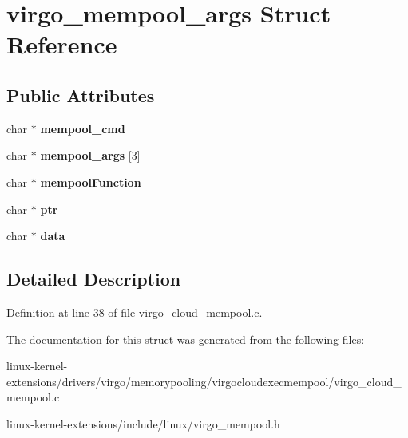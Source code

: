 \hypertarget{structvirgo__mempool__args}{\section{virgo\-\_\-mempool\-\_\-args Struct Reference}
\label{structvirgo__mempool__args}
}
\subsection*{Public Attributes}
\begin{DoxyCompactItemize}
\item 
\hypertarget{structvirgo__mempool__args_aa4eaa022d1329410453ef117ffb61ade}{char $\ast$ {\bfseries mempool\-\_\-cmd}}\label{structvirgo__mempool__args_aa4eaa022d1329410453ef117ffb61ade}

\item 
\hypertarget{structvirgo__mempool__args_ad92dc4c1469878eaee9b75b3b5edd869}{char $\ast$ {\bfseries mempool\-\_\-args} \mbox{[}3\mbox{]}}\label{structvirgo__mempool__args_ad92dc4c1469878eaee9b75b3b5edd869}

\item 
\hypertarget{structvirgo__mempool__args_aea29e5a1f735358ea6402a5580a38b13}{char $\ast$ {\bfseries mempool\-Function}}\label{structvirgo__mempool__args_aea29e5a1f735358ea6402a5580a38b13}

\item 
\hypertarget{structvirgo__mempool__args_a20dacf133f60928f9884b117f11906b9}{char $\ast$ {\bfseries ptr}}\label{structvirgo__mempool__args_a20dacf133f60928f9884b117f11906b9}

\item 
\hypertarget{structvirgo__mempool__args_a67b38f04ab233a35f094849969b91337}{char $\ast$ {\bfseries data}}\label{structvirgo__mempool__args_a67b38f04ab233a35f094849969b91337}

\end{DoxyCompactItemize}


\subsection{Detailed Description}


Definition at line 38 of file virgo\-\_\-cloud\-\_\-mempool.\-c.



The documentation for this struct was generated from the following files\-:\begin{DoxyCompactItemize}
\item 
linux-\/kernel-\/extensions/drivers/virgo/memorypooling/virgocloudexecmempool/virgo\-\_\-cloud\-\_\-mempool.\-c\item 
linux-\/kernel-\/extensions/include/linux/virgo\-\_\-mempool.\-h\end{DoxyCompactItemize}
